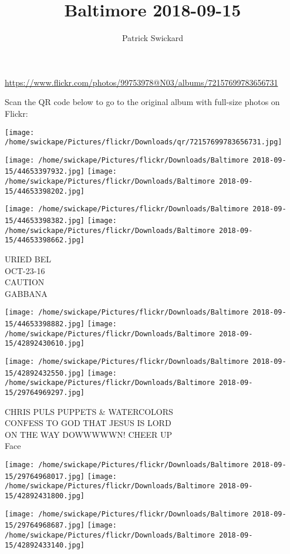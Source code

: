 \documentclass[10pt,letterpaper]{article}
\title{Baltimore 2018-09-15}
\author{Patrick Swickard}
\date{}
\begin{document}
\maketitle

\url{https://www.flickr.com/photos/99753978@N03/albums/72157699783656731}

Scan the QR code below to go to the original album with full-size photos on Flickr:

\texttt{[image: /home/swickape/Pictures/flickr/Downloads/qr/72157699783656731.jpg]}
\pagebreak

\texttt{[image: /home/swickape/Pictures/flickr/Downloads/Baltimore 2018-09-15/44653397932.jpg]}
\texttt{[image: /home/swickape/Pictures/flickr/Downloads/Baltimore 2018-09-15/44653398202.jpg]}

\texttt{[image: /home/swickape/Pictures/flickr/Downloads/Baltimore 2018-09-15/44653398382.jpg]}
\texttt{[image: /home/swickape/Pictures/flickr/Downloads/Baltimore 2018-09-15/44653398662.jpg]}

URIED BEL\\
OCT{-}23{-}16\\
CAUTION\\
GABBANA
\pagebreak

\texttt{[image: /home/swickape/Pictures/flickr/Downloads/Baltimore 2018-09-15/44653398882.jpg]}
\texttt{[image: /home/swickape/Pictures/flickr/Downloads/Baltimore 2018-09-15/42892430610.jpg]}

\texttt{[image: /home/swickape/Pictures/flickr/Downloads/Baltimore 2018-09-15/42892432550.jpg]}
\texttt{[image: /home/swickape/Pictures/flickr/Downloads/Baltimore 2018-09-15/29764969297.jpg]}

CHRIS PULS PUPPETS \& WATERCOLORS\\
CONFESS TO GOD THAT JESUS IS LORD\\
ON THE WAY DOWWWWWN!  CHEER UP\\
Face
\pagebreak

\texttt{[image: /home/swickape/Pictures/flickr/Downloads/Baltimore 2018-09-15/29764968017.jpg]}
\texttt{[image: /home/swickape/Pictures/flickr/Downloads/Baltimore 2018-09-15/42892431800.jpg]}

\texttt{[image: /home/swickape/Pictures/flickr/Downloads/Baltimore 2018-09-15/29764968687.jpg]}
\texttt{[image: /home/swickape/Pictures/flickr/Downloads/Baltimore 2018-09-15/42892433140.jpg]}
\end{document}
